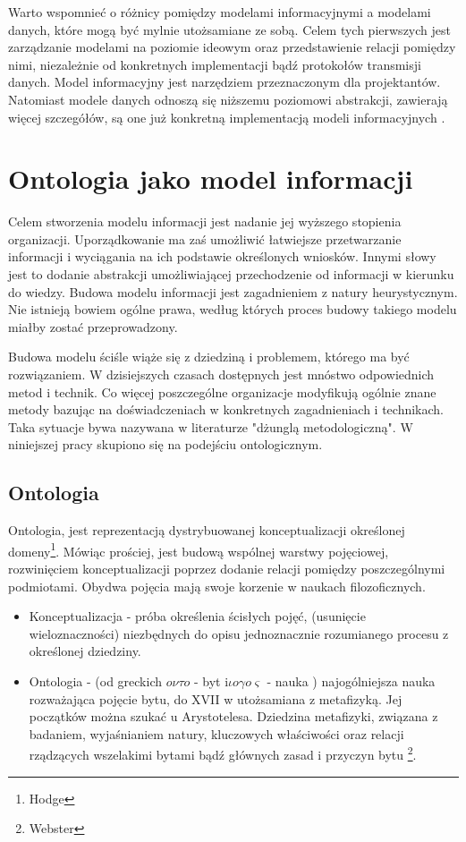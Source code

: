 \documentclass[12pt,a4paper,notitlepage]{article}
\begin{document}
Warto wspomnieć o różnicy pomiędzy modelami informacyjnymi a modelami danych,
które mogą być mylnie utożsamiane ze sobą. Celem tych pierwszych jest 
zarządzanie modelami na poziomie ideowym oraz przedstawienie relacji pomiędzy
nimi, niezależnie od konkretnych implementacji bądź protokołów transmisji
danych. Model informacyjny jest narzędziem przeznaczonym dla projektantów.
Natomiast modele danych odnoszą się niższemu poziomowi abstrakcji, zawierają
więcej szczegółów, są one już konkretną implementacją modeli informacyjnych 
\cite{RFC3444}.



\section{Ontologia jako model informacji}
Celem stworzenia modelu informacji jest nadanie jej wyższego stopienia organizacji. Uporządkowanie ma zaś umożliwić łatwiejsze przetwarzanie informacji i wyciągania na ich podstawie określonych wniosków. Innymi słowy jest to dodanie abstrakcji umożliwiającej przechodzenie od informacji w kierunku do wiedzy. Budowa modelu informacji jest zagadnieniem z natury heurystycznym. Nie istnieją bowiem ogólne prawa, według których proces budowy takiego modelu miałby zostać przeprowadzony. 

Budowa modelu ściśle wiąże się z dziedziną i problemem, którego ma być rozwiązaniem. W dzisiejszych czasach dostępnych jest mnóstwo odpowiednich metod i technik. Co więcej poszczególne organizacje modyfikują ogólnie znane metody bazując na doświadczeniach w konkretnych zagadnieniach i technikach. Taka sytuacje bywa nazywana w literaturze "dżunglą metodologiczną"\cite{Verhoef}. W niniejszej pracy skupiono się na podejściu ontologicznym.

\subsection{Ontologia}
Ontologia, jest reprezentacją dystrybuowanej konceptualizacji określonej domeny\footnote{Hodge}. Mówiąc prościej, jest budową wspólnej warstwy pojęciowej, rozwinięciem konceptualizacji poprzez dodanie relacji pomiędzy poszczególnymi podmiotami. Obydwa pojęcia mają swoje korzenie w naukach filozoficznych.
\begin{itemize}
   \item Konceptualizacja - próba określenia ścisłych pojęć, (usunięcie wieloznaczności) niezbędnych do opisu jednoznacznie rozumianego procesu z określonej dziedziny.
	\item Ontologia - (od greckich $o \nu \tau o$ - byt i$\iota o\gamma o\varsigma$ - nauka ) najogólniejsza nauka rozważająca pojęcie bytu, do XVII w utożsamiana z metafizyką. Jej początków można szukać u Arystotelesa. Dziedzina metafizyki, związana z badaniem, wyjaśnianiem natury, kluczowych właściwości oraz relacji rządzących wszelakimi bytami bądź głównych zasad i przyczyn bytu \footnote{Webster}.
\end{itemize}  
\end{document}

